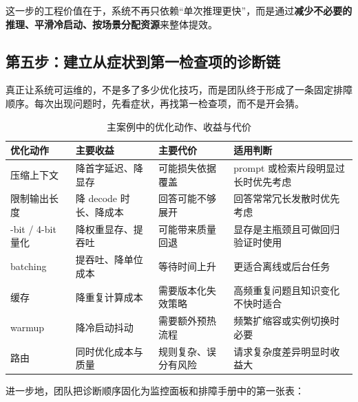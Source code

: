 这一步的工程价值在于，系统不再只依赖“单次推理更快”，而是通过\textbf{减少不必要的推理、平滑冷启动、按场景分配资源}来整体提效。

\subsection{第五步：建立从症状到第一检查项的诊断链}
真正让系统可运维的，不是多了多少优化技巧，而是团队终于形成了一条固定排障顺序。每次出现问题时，先看症状，再找第一检查项，而不是开会猜。

\begin{table}[H]
\small
\centering
\begin{tabularx}{\textwidth}{>{\raggedright\arraybackslash}p{2.6cm}>{\raggedright\arraybackslash}p{2.5cm}>{\raggedright\arraybackslash}p{2.8cm}>{\raggedright\arraybackslash}X}
\toprule
\textbf{优化动作} & \textbf{主要收益} & \textbf{主要代价} & \textbf{适用判断} \\
\midrule
压缩上下文 & 降首字延迟、降显存 & 可能损失依据覆盖 & prompt 或检索片段明显过长时优先考虑 \\
限制输出长度 & 降 decode 时长、降成本 & 回答可能不够展开 & 回答常常冗长发散时优先考虑 \\
8-bit / 4-bit 量化 & 降权重显存、提吞吐 & 可能带来质量回退 & 显存是主瓶颈且可做回归验证时使用 \\
batching & 提吞吐、降单位成本 & 等待时间上升 & 更适合离线或后台任务 \\
缓存 & 降重复计算成本 & 需要版本化失效策略 & 高频重复问题且知识变化不快时适合 \\
warmup & 降冷启动抖动 & 需要额外预热流程 & 频繁扩缩容或实例切换时必要 \\
路由 & 同时优化成本与质量 & 规则复杂、误分有风险 & 请求复杂度差异明显时收益大 \\
\bottomrule
\end{tabularx}
\caption{主案例中的优化动作、收益与代价}
\label{tab:main-case-optimization-actions}
\end{table}

进一步地，团队把诊断顺序固化为监控面板和排障手册中的第一张表：

